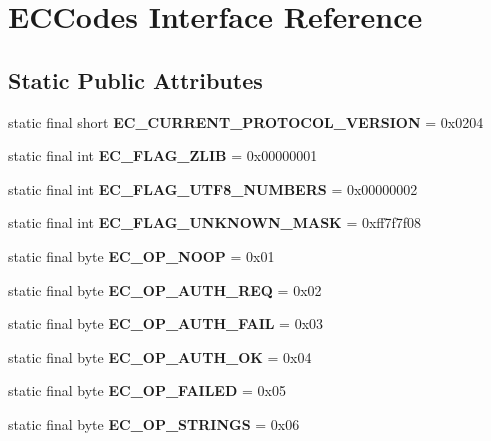 \section{ECCodes Interface Reference}
\label{interfaceECCodes}
\subsection*{Static Public Attributes}
\begin{DoxyCompactItemize}
\item 
static final short {\bfseries EC\_\-CURRENT\_\-PROTOCOL\_\-VERSION} = 0x0204\label{interfaceECCodes_ab28f542f44013cb0cbeea1892750ce86}

\item 
static final int {\bfseries EC\_\-FLAG\_\-ZLIB} = 0x00000001\label{interfaceECCodes_a8846c8f641ae8e7d1b0d53ff4c3d3685}

\item 
static final int {\bfseries EC\_\-FLAG\_\-UTF8\_\-NUMBERS} = 0x00000002\label{interfaceECCodes_a949f3bf2810ef46bb4ec604fd2df3cd8}

\item 
static final int {\bfseries EC\_\-FLAG\_\-UNKNOWN\_\-MASK} = 0xff7f7f08\label{interfaceECCodes_a8f79a7491bb0d3f94b3c77a04b8d28f2}

\item 
static final byte {\bfseries EC\_\-OP\_\-NOOP} = 0x01\label{interfaceECCodes_a6514ec9bba14067cb14912b0be4b622a}

\item 
static final byte {\bfseries EC\_\-OP\_\-AUTH\_\-REQ} = 0x02\label{interfaceECCodes_a012a0dd4938465051e5ed7e8a93a1fab}

\item 
static final byte {\bfseries EC\_\-OP\_\-AUTH\_\-FAIL} = 0x03\label{interfaceECCodes_a5c6254499c4d5e26e73038749e1f676f}

\item 
static final byte {\bfseries EC\_\-OP\_\-AUTH\_\-OK} = 0x04\label{interfaceECCodes_af9bf7770a6fd00dba5cceaa0b83153ef}

\item 
static final byte {\bfseries EC\_\-OP\_\-FAILED} = 0x05\label{interfaceECCodes_a723d2602cd260beb4721cfb513ebedfa}

\item 
static final byte {\bfseries EC\_\-OP\_\-STRINGS} = 0x06\label{interfaceECCodes_ae7a6a04474f6fcecc7a669b405683c7d}


\end{DoxyCompactItemize}
